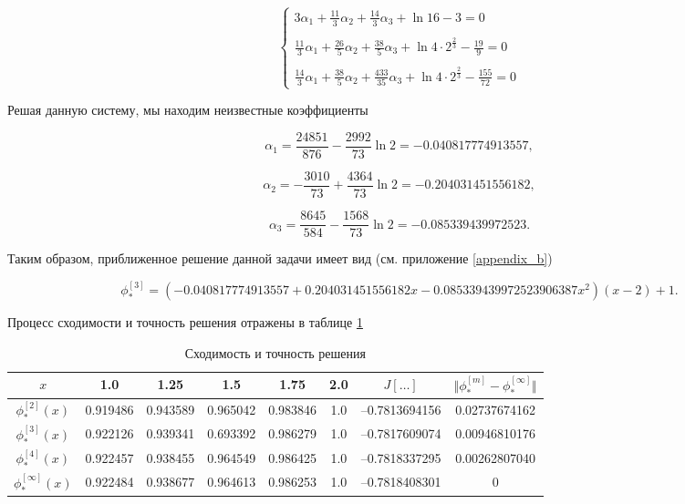 \documentclass{article}
\begin{document}
\begin{displaymath}
	\begin{cases}
		3\alpha_{1} + \frac{11}{3}\alpha_{2} + \frac{14}{3}\alpha_{3} + \ln{16} - 3 = 0 \\
		\\
		\frac{11}{3}\alpha_{1} + \frac{26}{5}\alpha_{2} + \frac{38}{5}\alpha_{3} + \ln{4 \cdot 2^{\frac{2}{3}}} - \frac{19}{9} = 0 \\
		\\
		\frac{14}{3}\alpha_{1} + \frac{38}{5}\alpha_{2} + \frac{433}{35}\alpha_{3} + \ln{4 \cdot 2^{\frac{2}{3}}} - \frac{155}{72} = 0
	\end{cases}
\end{displaymath}

\noindent Решая данную систему, мы находим неизвестные коэффициенты

\begin{displaymath}
	\alpha_{1} = \frac{24851}{876} - \frac{2992}{73} \ln{2} = -0.040817774913557,
\end{displaymath}

\begin{displaymath}	
	\alpha_{2} = -\frac{3010}{73} + \frac{4364}{73} \ln{2} = -0.204031451556182, 
\end{displaymath}

\begin{displaymath}
	\alpha_{3} = \frac{8645}{584} - \frac{1568}{73} \ln{2} = -0.085339439972523.
\end{displaymath}

Таким образом, приближенное решение данной задачи имеет вид (см. приложение \ref{appendix_b})

\begin{displaymath}	
	\phi_{\ast}^{[3]} = (-0.040817774913557+0.204031451556182x -0.085339439972523906387x^2)(x-2) + 1.
\end{displaymath}

\noindent Процесс сходимости и точность решения отражены в таблице \ref{table_process_of_convergence_rank_2}

\begin{table}[!h]
\centering
\begin{tabular}{|c|c|c|c|c|c|c|c|}
	\hline
	$x$ & 1.0 & 1.25 & 1.5 & 1.75 & 2.0 & $J[\ldots]$ & $\Vert \phi_{\ast}^{[m]} - \phi_{\ast}^{[\infty]} \Vert$ \\
	\hline \hline

	$\phi_{\ast}^{[2]}(x)$ & 0.919486 & 0.943589 & 0.965042 & 0.983846 & 1.0 & –0.7813694156 & 0.02737674162 \\	\hline
	$\phi_{\ast}^{[3]}(x)$ & 0.922126 & 0.939341 & 0.693392 & 0.986279 & 1.0 & –0.7817609074 & 0.00946810176 \\	\hline
	$\phi_{\ast}^{[4]}(x)$ & 
0.922457 & 0.938455 & 0.964549 & 0.986425 & 1.0 & –0.7818337295 & 0.00262807040 \\	\hline
	$\phi_{\ast}^{[\infty]}(x)$ & 0.922484 & 0.938677 & 0.964613 & 0.986253 & 1.0 & –0.7818408301 & 0 \\	\hline

\end{tabular}
\caption{Сходимость и точность решения}
\label{table_process_of_convergence_rank_2}
\end{table}
\end{document}
